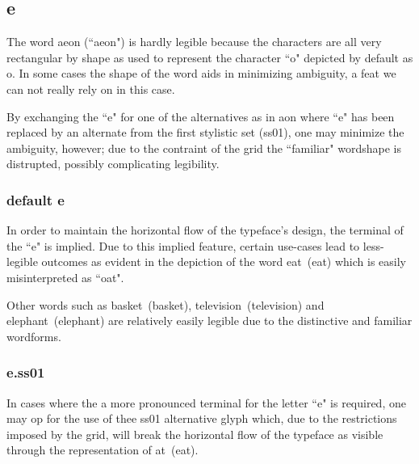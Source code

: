 \subsection{e}
The word {\ssdefault aeon} (``aeon") is hardly legible because the characters
are all very rectangular by shape as used to represent the character ``o"
depicted by default as {\ssdefault o}. In some cases the shape of the word aids
in minimizing ambiguity, a feat we can not really rely on in this case.


By exchanging the ``e" for one of the alternatives as in
{\ssdefault aon} where ``e" has been replaced by an alternate from the
first stylistic set (ss01), one may minimize the ambiguity, however; due to the
contraint of the grid the ``familiar" wordshape is distrupted, possibly
complicating legibility.

\subsubsection{default {\ssdefault e}}
In order to maintain the horizontal flow of the typeface's design, the terminal
of the ``e" is implied. Due to this implied feature, certain use-cases lead to
less-legible outcomes as evident in the depiction of the word
\mbox{{\ssdefault eat} (eat)} which is easily misinterpreted as ``oat".

Other words such as
\mbox{{\ssdefault basket} (basket)},
\mbox{{\ssdefault television} (television)} and
\mbox{{\ssdefault elephant} (elephant)}
are relatively easily legible due to the distinctive and familiar wordforms.

\subsubsection{{\ssone e}.ss01}

In cases where the a more pronounced terminal for the letter ``e" is required,
one may op for the use of thee ss01 alternative glyph which, due to the
restrictions imposed by the grid, will break the horizontal flow of the
typeface as visible through the representation of
\mbox{{at} (eat)}.
